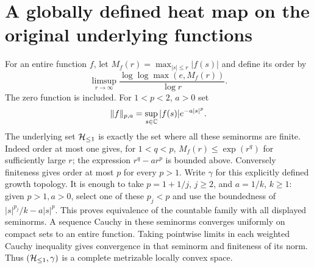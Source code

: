 \section{A globally defined heat map on the original underlying functions}
\label{sec:cq-heatspace}
For an entire function $f$, let
$M_f(r)=\max_{|s|\leq r}|f(s)|$ and define its order by
\[
 \limsup_{r\to\infty}
       \frac{\log\log\max(e,M_f(r))}{\log r}.
\]
The zero function is included. For $1<p<2$, $a>0$ set
\[
 \|f\|_{p,a}=\sup_{s\in\mathbb C}|f(s)|e^{-a|s|^p}.
\]
The underlying set $\mathcal H_{\leq 1}$ is exactly the set where all these seminorms
are finite. Indeed order at most one gives, for $1<q<p$,
$M_f(r)\leq\exp(r^q)$ for sufficiently large $r$; the expression
$r^q-ar^p$ is bounded above. Conversely finiteness gives order at
most $p$ for every $p>1$.
Write $\gamma$ for this explicitly defined growth topology.
It is enough to take $p=1+1/j$, $j\geq2$, and $a=1/k$, $k\geq1$:
given $p>1,a>0$, select one of these $p_j<p$ and use the boundedness
of $|s|^{p_j}/k-a|s|^p$. This proves equivalence of the countable
family with all displayed seminorms. A sequence Cauchy in these
seminorms converges uniformly on compact sets to an entire function.
Taking pointwise limits in each weighted Cauchy inequality gives
convergence in that seminorm and finiteness of its norm. Thus
$(\mathcal H_{\leq 1},\gamma)$ is a complete metrizable locally convex space.

